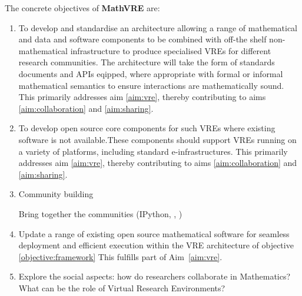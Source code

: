 \documentclass[a4paper,11pt]{article}
\newcommand{\XX}{\textbf{MathVRE}\xspace}
\newcommand{\TheProject}{\XX}
\begin{document}
The concrete objectives of \TheProject are:
\begin{enumerate}
\item\label{objective:framework} To develop and standardise
  an architecture allowing a range of mathematical and
  data and software components to be combined 
  with off-the shelf non-mathematical infrastructure to produce
  specialised VREs for different research communities. The
  architecture will take the form of standards documents and APIs
  eqipped, where appropriate with formal or informal mathematical
  semantics to ensure interactions are mathematically sound. This primarily
  addresses aim \ref{aim:vre}, thereby contributing to aims
  \ref{aim:collaboration} and \ref{aim:sharing}. 

\item\label{objectives:core} To develop open source core components
for such VREs where existing software is not available.These
components should support VREs running
 on a variety of
  platforms, including standard e-infrastructures. This primarily
  addresses aim \ref{aim:vre}, thereby contributing to aims
  \ref{aim:collaboration} and \ref{aim:sharing}.
  




\item \label{objective:community}Community building

  Bring together the communities (IPython, \Sage, \Singular)

\item \label{objective:updates} Update a range of existing open source
  mathematical software for seamless deployment and efficient
  execution within the VRE architecture of objective \ref{objective:framework}
  This fulfills part of Aim~\ref{aim:vre}.


\item \label{objective:social}Explore the social aspects: how do researchers collaborate in
  Mathematics? What can be the role of Virtual Research Environments?


\end{enumerate}
\end{document}
